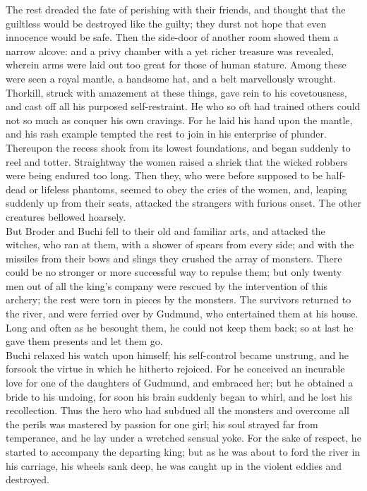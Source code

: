 \documentclass[10pt,a4paper]{report}
\begin{document}
The rest dreaded the fate of perishing with their friends, and thought that the guiltless would be destroyed like the guilty; they durst not hope that even innocence would be safe. Then the side-door of another room showed them a narrow alcove: and a privy chamber with a yet richer treasure was revealed, wherein arms were laid out too great for those of human stature. Among these were seen a royal mantle, a handsome hat, and a belt marvellously wrought. Thorkill, struck with amazement at these things, gave rein to his covetousness, and cast off all his purposed self-restraint. He who so oft had trained others could not so much as conquer his own cravings. For he laid his hand upon the mantle, and his rash example tempted the rest to join in his enterprise of plunder. Thereupon the recess shook from its lowest foundations, and began suddenly to reel and totter. Straightway the women raised a shriek that the wicked robbers were being endured too long. Then they, who were before supposed to be half-dead or lifeless phantoms, seemed to obey the cries of the women, and, leaping suddenly up from their seats, attacked the strangers with furious onset. The other creatures bellowed hoarsely.\\

But Broder and Buchi fell to their old and familiar arts, and attacked the witches, who ran at them, with a shower of spears from every side; and with the missiles from their bows and slings they crushed the array of monsters. There could be no stronger or more successful way to repulse them; but only twenty men out of all the king's company were rescued by the intervention of this archery; the rest were torn in pieces by the monsters. The survivors returned to the river, and were ferried over by Gudmund, who entertained them at his house. Long and often as he besought them, he could not keep them back; so at last he gave them presents and let them go.\\

Buchi relaxed his watch upon himself; his self-control became unstrung, and he forsook the virtue in which he hitherto rejoiced. For he conceived an incurable love for one of the daughters of Gudmund, and embraced her; but he obtained a bride to his undoing, for soon his brain suddenly began to whirl, and he lost his recollection. Thus the hero who had subdued all the monsters and overcome all the perils was mastered by passion for one girl; his soul strayed far from temperance, and he lay under a wretched sensual yoke. For the sake of respect, he started to accompany the departing king; but as he was about to ford the river in his carriage, his wheels sank deep, he was caught up in the violent eddies and destroyed.\\
\end{document}
